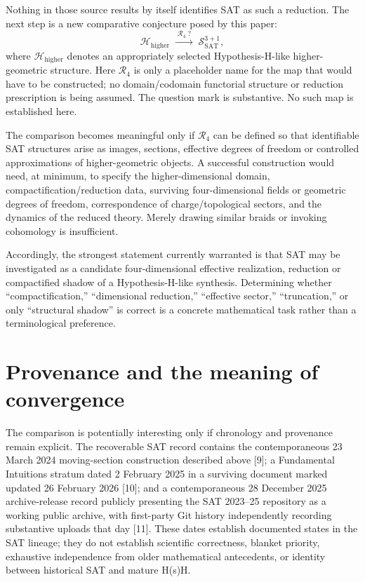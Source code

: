 \documentclass[11pt]{article}
\begin{document}
Nothing in those source results by itself identifies SAT as such a reduction. The next step is a new comparative conjecture posed by this paper:
\begin{equation}
\mathcal H_{\mathrm{higher}}\;\xrightarrow{\;\mathcal R_{4}\;?\;}\;\mathcal S_{\mathrm{SAT}}^{3+1},
\end{equation}
where $\mathcal H_{\mathrm{higher}}$ denotes an appropriately selected Hypothesis-H-like higher-geometric structure. Here $\mathcal R_4$ is only a placeholder name for the map that would have to be constructed; no domain/codomain functorial structure or reduction prescription is being assumed. The question mark is substantive. No such map is established here.

The comparison becomes meaningful only if $\mathcal R_4$ can be defined so that identifiable SAT structures arise as images, sections, effective degrees of freedom or controlled approximations of higher-geometric objects. A successful construction would need, at minimum, to specify the higher-dimensional domain, compactification/reduction data, surviving four-dimensional fields or geometric degrees of freedom, correspondence of charge/topological sectors, and the dynamics of the reduced theory. Merely drawing similar braids or invoking cohomology is insufficient.

Accordingly, the strongest statement currently warranted is that SAT may be investigated as a candidate four-dimensional effective realization, reduction or compactified shadow of a Hypothesis-H-like synthesis. Determining whether ``compactification,'' ``dimensional reduction,'' ``effective sector,'' ``truncation,'' or only ``structural shadow'' is correct is a concrete mathematical task rather than a terminological preference.

\section{Provenance and the meaning of convergence}
The comparison is potentially interesting only if chronology and provenance remain explicit. The recoverable SAT record contains the contemporaneous 23 March 2024 moving-section construction described above [9]; a Fundamental Intuitions stratum dated 2 February 2025 in a surviving document marked updated 26 February 2026 [10]; and a contemporaneous 28 December 2025 archive-release record publicly presenting the SAT 2023--25 repository as a working public archive, with first-party Git history independently recording substantive uploads that day [11]. These dates establish documented states in the SAT lineage; they do not establish scientific correctness, blanket priority, exhaustive independence from older mathematical antecedents, or identity between historical SAT and mature H(s)H.
\end{document}
